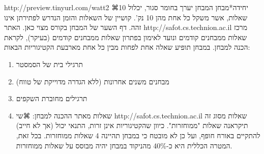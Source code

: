       http://preview.tinyurl.com/watt2
⌘יחידה*{מבחן}
      המבחן יערך בחומר סגור, יכלול 10 שאלות, אשר משקל כל אחת מהן 10 נק'. קושיין של השאלות והזמן הנדרש לפתירתן אינו זהה. דף השער של המבחן בקורס מצוי כאן. האתר http://safot.cs.technion.ac.il מרכז שאלות ממבחנים קודמים ונועד לאימון בפתרון שאלות ממבחנים קודמים (בעיקר), לקראת הכנה למבחן.
      במבחן תופיע שאלה אחת לפחות מבין כל אחת מארבעת הקטיגוריות הבאות:
      \begin{enumerate}
      \item תרגילי בית של הסמסטר
      \item מבחנים משנים אחרונות (ללא הגדרה מדוייקת של טווח)
      \item תרגילים מחוברת השקפים
      \item שאלות מאתר ההכנה למבחן: 
    ⌘שי{ 
      http://safot.cs.technion.ac.il
      }
      שאלות מסוג זה תיקראנה שאלות "ממוחזרות". כיוון שהקטיגוריות אינן זרות, התנאי יכול (אך לא חייב) להתקיים באורח חופף, ועל כן לא מובטח כי במבחן תהיינה 4 שאלות ממוחזרות.   בכל זאת,  המטרה הכללית היא כ-40\% מהניקוד במבחן יהיה מבוסס על שאלות ממוחזרות.
      \end{enumerate}

